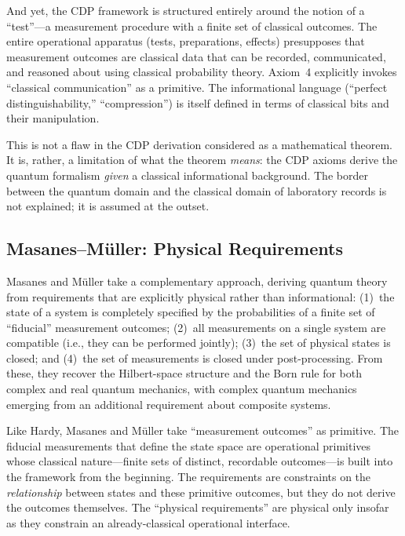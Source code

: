 \documentclass[12pt,a4paper,twoside]{article}
\begin{document}
And yet, the CDP framework is structured entirely around the notion of a ``test''---a measurement procedure with a finite set of classical outcomes. The entire operational apparatus (tests, preparations, effects) presupposes that measurement outcomes are classical data that can be recorded, communicated, and reasoned about using classical probability theory. Axiom~4 explicitly invokes ``classical communication'' as a primitive. The informational language (``perfect distinguishability,'' ``compression'') is itself defined in terms of classical bits and their manipulation.

This is not a flaw in the CDP derivation considered as a mathematical theorem. It is, rather, a limitation of what the theorem \emph{means}: the CDP axioms derive the quantum formalism \emph{given} a classical informational background. The border between the quantum domain and the classical domain of laboratory records is not explained; it is assumed at the outset.

\subsection{Masanes--M\"{u}ller: Physical Requirements}

Masanes and M\"{u}ller \cite{Masanes2011} take a complementary approach, deriving quantum theory from requirements that are explicitly physical rather than informational: (1)~the state of a system is completely specified by the probabilities of a finite set of ``fiducial'' measurement outcomes; (2)~all measurements on a single system are compatible (i.e., they can be performed jointly); (3)~the set of physical states is closed; and (4)~the set of measurements is closed under post-processing. From these, they recover the Hilbert-space structure and the Born rule for both complex and real quantum mechanics, with complex quantum mechanics emerging from an additional requirement about composite systems.

Like Hardy, Masanes and M\"{u}ller take ``measurement outcomes'' as primitive. The fiducial measurements that define the state space are operational primitives whose classical nature---finite sets of distinct, recordable outcomes---is built into the framework from the beginning. The requirements are constraints on the \emph{relationship} between states and these primitive outcomes, but they do not derive the outcomes themselves. The ``physical requirements'' are physical only insofar as they constrain an already-classical operational interface.
\end{document}

